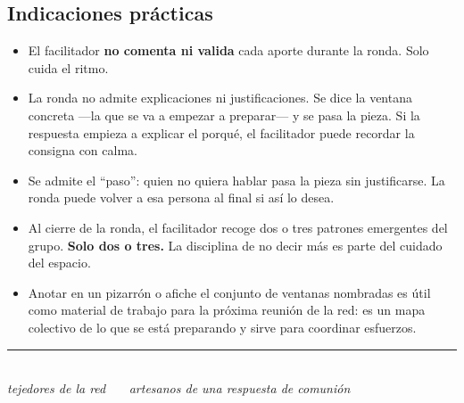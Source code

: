 \documentclass[11pt, a4paper]{article}
\begin{document}
\subsection*{Indicaciones prácticas}

\begin{itemize}
  \item El facilitador \textbf{no comenta ni valida} cada aporte durante la ronda. Solo cuida el ritmo.
  \item La ronda no admite explicaciones ni justificaciones. Se dice la ventana concreta ---la que se va a empezar a preparar--- y se pasa la pieza. Si la respuesta empieza a explicar el porqué, el facilitador puede recordar la consigna con calma.
  \item Se admite el ``paso'': quien no quiera hablar pasa la pieza sin justificarse. La ronda puede volver a esa persona al final si así lo desea.
  \item Al cierre de la ronda, el facilitador recoge dos o tres patrones emergentes del grupo. \textbf{Solo dos o tres.} La disciplina de no decir más es parte del cuidado del espacio.
  \item Anotar en un pizarrón o afiche el conjunto de ventanas nombradas es útil como material de trabajo para la próxima reunión de la red: es un mapa colectivo de lo que se está preparando y sirve para coordinar esfuerzos.
\end{itemize}

\vspace{2em}

\begin{center}
{\color{regla}\rule{0.35\linewidth}{0.5pt}}\\
\vspace{0.6em}
{\color{tenue}\itshape\small tejedores de la red \ \textbullet\ \ artesanos de una respuesta de comunión}
\end{center}
\end{document}
